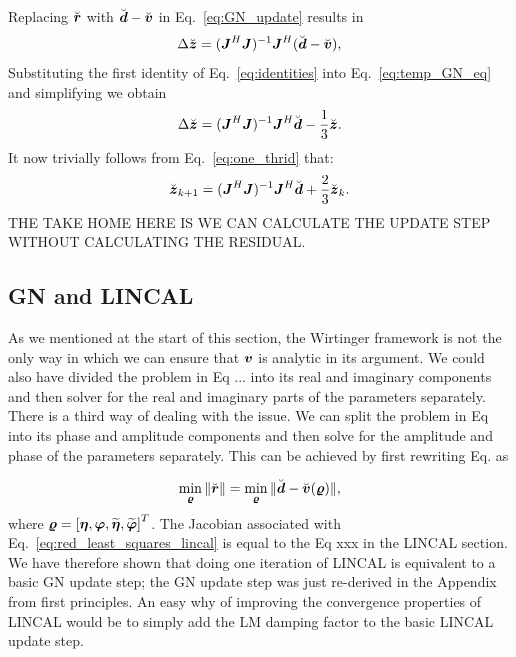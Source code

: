 \documentclass[useAMS,usenatbib]{mn2e}
\newcommand{\bz}{\bmath{z}}
\newcommand{\br}{\bmath{r}}
\newcommand{\bd}{\bmath{d}}
\newcommand{\bv}{\bmath{v}}
\newcommand{\bJ}{\bmath{J}}
\begin{document}
Replacing $\breve{\br}$ with $\breve{\bd}-\breve{\bv}$ in Eq.~\eqref{eq:GN_update} results in
\begin{equation}
\label{eq:temp_GN_eq}
\Delta \breve{\bz} = (\bJ^H\bJ)^{-1}\bJ^H(\breve{\bd}-\breve{\bv}), 
\end{equation}
Substituting the first identity of Eq.~\eqref{eq:identities} into Eq.~\eqref{eq:temp_GN_eq} and simplifying we obtain
\begin{equation}
\label{eq:one_thrid}
\Delta \breve{\bz} = (\bJ^H\bJ)^{-1}\bJ^H\breve{\bd}-\frac{1}{3}\breve{\bz}.
\end{equation}
It now trivially follows from Eq.~\eqref{eq:one_thrid} that:
\begin{equation}
\label{eq:two_thrids}
\breve{\bz}_{k+1} = (\bJ^H\bJ)^{-1}\bJ^H\breve{\bd} + \frac{2}{3}\breve{\bz}_{k}. 
\end{equation}
THE TAKE HOME HERE IS WE CAN CALCULATE THE UPDATE STEP WITHOUT CALCULATING THE RESIDUAL.

\subsection{GN and LINCAL}
As we mentioned at the start of this section, the Wirtinger framework is not the only way in which we can ensure that $\bv$ is analytic in its argument. We could also 
have divided the problem in Eq ... into its real and imaginary components and then solver for the real and imaginary parts of the parameters separately. There is a third way
of dealing with the issue. We can split the problem in Eq into its phase and amplitude components and then solve for the amplitude and phase of the parameters separately.
This can be achieved by first rewriting Eq. as

\begin{equation}
\label{eq:red_least_squares_lincal}
\min_{\bmath{\varrho}} \|\breve{\br}\| = \min_{\bmath{\varrho}} \|\breve{\bd} - \breve{\bv}(\bmath{\varrho})\|, 
\end{equation}
where $\bmath{\varrho} = \left [\bmath{\eta},\bmath{\varphi},\widetilde{\bmath{\eta}}, \widetilde{\bmath{\varphi}}\right ]^T$. The Jacobian associated with 
Eq.~\eqref{eq:red_least_squares_lincal} is equal to the Eq xxx in the LINCAL section.
We have therefore shown that doing one iteration of LINCAL is equivalent to a basic GN update step; the GN update step was just re-derived in the Appendix from first principles.
An easy why of improving the convergence properties of LINCAL would be to simply add the LM damping factor to the basic LINCAL update step. 
\end{document}

